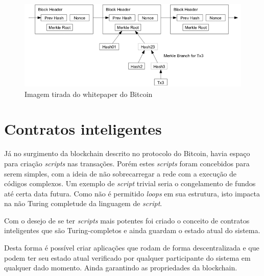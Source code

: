 \documentclass{ufsctex/ufsctex}
\begin{document}
\begin{figure}[h]
	\centering
	\includegraphics[scale=0.4]{blockchain}
	\caption{Imagem tirada do whitepaper do Bitcoin}
	\label{fig:blockchain}
\end{figure}

\section{Contratos inteligentes}

Já no surgimento da blockchain descrito no protocolo do Bitcoin, havia espaço para 
criação \textit{scripts} nas transações. Porém estes \textit{scripts} foram concebidos
para serem simples, com a ideia de não sobrecarregar a rede com a execução de códigos
complexos. Um exemplo de \textit{script} trivial seria o congelamento de fundos até
certa data futura. Como não é permitido \textit{loops} em sua estrutura, isto impacta
na não Turing completude da linguagem de \textit{script}.\cite{nakamoto2012bitcoin}

Com o desejo de se ter \textit{scripts} mais potentes foi criado o conceito de contratos
inteligentes que são Turing-completos e ainda guardam o estado atual do sistema.
\cite{ethereum}

Desta forma é possível criar aplicações que rodam de forma descentralizada e que podem
ter seu estado atual verificado por qualquer participante do sistema em qualquer dado
momento. Ainda garantindo as propriedades da blockchain.



\end{document}
